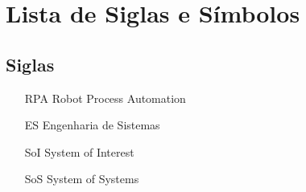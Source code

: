 
\newpage
\chapter*{Lista de Siglas e Símbolos} %

	\section*{Siglas}
	
		\begin{itemize}[labelwidth=5em,leftmargin=\dimexpr{}+\relax,align=left]
			\item[RPA] Robot Process Automation
			\item[ES] Engenharia de Sistemas
			\item[SoI] System of Interest
			\item[SoS] System of Systems  
		\end{itemize}
	
		\thispagestyle{empty}

	
	
	
	
	